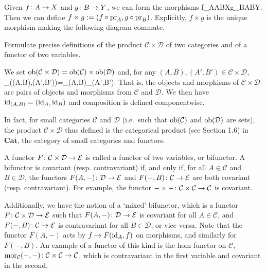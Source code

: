 \item Given $f\colon A\to X$ and $g\colon B\to Y$, we can form the morphisms
\bse
f\circ\pr_A\cl A\times B\to X\qquad {}\qquad g\circ \pr_B\cl A\times B\to Y.
\ese
Then we can define $f\times g:=(f\circ\mathrm{pr}_A,g\circ\mathrm{pr}_B)$. Explicitly, $f\times g$ is the unique morphism making the following diagram commute.
\bse
{}
\ese
\een
\es

\bx
Formulate precise definitions of the product $\mathcal{C}\times \mathcal{D}$ of two categories and of a functor of two variables.
\ex

\bs
We set $\operatorname{ob}(\mathcal{C}\times \mathcal{D})=\operatorname{ob}(\mathcal{C})\times\operatorname{ob}(\mathcal{D})$ and, for any $(A,B),(A',B')\in\mathcal{C}\times \mathcal{D}$,
\bse
\mor_{\times {}}((A,B),(A',B'))=\mor_{}(A,B)\times \mor_{}(A',B').
\ese
That is, the objects and morphisms of $\mathcal{C}\times \mathcal{D}$ are pairs of objects and morphisms from $\mathcal{C}$ and $\mathcal{D}$. We then have $\mathrm{id}_{(A,B)}=(\mathrm{id}_A,\mathrm{id}_B)$ and composition is defined componentwise.

In fact, for small categories $\mathcal{C}$ and $\mathcal{D}$ (i.e.\ such that $\operatorname{ob}(\mathcal{C})$ and $\operatorname{ob}(\mathcal{D})$ are sets), the product $\mathcal{C}\times \mathcal{D}$ thus defined is the categorical product (see Section 1.6) in $\mathbf{Cat}$, the category of small categories and functors.

A functor $F\colon\mathcal{C}\times \mathcal{D}\to\mathcal{E}$ is called a functor of two variables, or bifunctor. A bifunctor is covariant (resp. contravariant) if, and only if, for all $A\in\mathcal{C}$ and $B\in\mathcal{D}$, the functors $F(A,-)\colon \mathcal{D}\to \mathcal{E}$ and $F(-,B)\colon \mathcal{C}\to \mathcal{E}$ are both covariant (resp. contravariant). For example, the functor $-\times -\colon \mathcal{C}\times \mathcal{C}\to\mathcal{C}$ is covariant.

Additionally, we have the notion of a `mixed' bifunctor, which is a functor $F\colon\mathcal{C}\times \mathcal{D}\to\mathcal{E}$ such that $F(A,-)\colon \mathcal{D}\to \mathcal{E}$ is covariant for all $A\in\mathcal{C}$, and $F(-,B)\colon \mathcal{C}\to \mathcal{E}$ is contravariant for all $B\in\mathcal{D}$, or vice versa. Note that the functor $F(A,-)$ acts by $f\mapsto F(\mathrm{id}_A,f)$ on morphisms, and similarly for $F(-,B)$. An example of a functor of this kind is the hom-functor on $\mathcal{C}$, $\operatorname{mor}_{\mathcal{C}}(-,-) \colon \mathcal{C} \times \mathcal{C} \to \mathcal{C}$, which is contravariant in the first variable and covariant in the second.
\es

